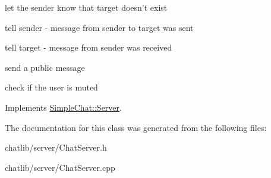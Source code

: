let the sender know that target doesn't exist

tell sender -\/ message from sender to target was sent

tell target -\/ message from sender was received

send a public message

check if the user is muted 

Implements \hyperlink{classSimpleChat_1_1Server}{Simple\-Chat\-::\-Server}.



The documentation for this class was generated from the following files\-:\begin{DoxyCompactItemize}
\item 
chatlib/server/Chat\-Server.\-h\item 
chatlib/server/Chat\-Server.\-cpp\end{DoxyCompactItemize}
